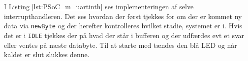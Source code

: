 I Listing \ref{lst:PSoC_m_uartinth} ses implementeringen af selve interrupthandleren. Det ses hvordan der først tjekkes for om der er kommet ny data via \texttt{newByte} og der herefter kontrolleres hvilket stadie, systemet er i. Hvis det er i \texttt{IDLE} tjekkes der på hvad der står i bufferen og der udfærdes evt et svar eller ventes på næste databyte. Til at starte med tændes den blå LED og når kaldet er slut slukkes denne.

\clearpage